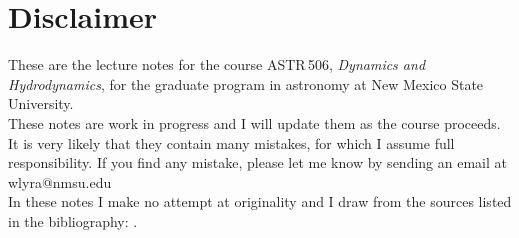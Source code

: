 \chapter*{Disclaimer}

These are the lecture notes for the course ASTR\,506, {\it Dynamics and
  Hydrodynamics}, for the graduate program in astronomy
at New Mexico State University. \\

These notes are work in progress and I will update them as the course proceeds.
It is very likely that they contain many mistakes, for which I assume full responsibility. If you find any mistake, please let me know by sending an email at
wlyra@nmsu.edu\\

In these notes I make no attempt at originality and I draw from the
sources listed in the bibliography: \cite{vanBiezen,Kolecki,DullemondPeeters,Wheeler,Leishman,Sormani22}.


